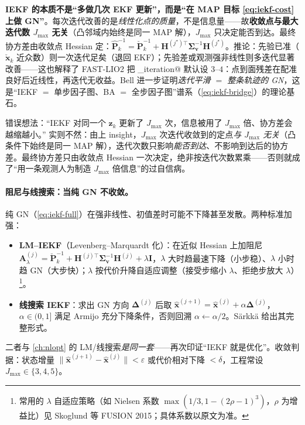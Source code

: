 \begin{insight}
\textbf{IEKF 的本质不是“多做几次 EKF 更新”，而是“在 MAP 目标 \cref{eq:iekf-cost} 上做 GN”}。每次迭代改善的是\emph{线性化点的质量}，不是信息量——故\textbf{收敛点与最大迭代数 $J_{\max}$ 无关}（凸邻域内始终是同一 MAP 解），$J_{\max}$ 只决定能否到达。最终协方差由收敛点 Hessian 定：$\hat{\mathbf{P}}_k^{-1}=\check{\mathbf{P}}_k^{-1}+\mathbf{H}^{(j^\star)\top}\boldsymbol{\Sigma}_{\mathbf{v}}^{-1}\mathbf{H}^{(j^\star)}$。推论：先验已准（$\check{\mathbf{x}}_k$ 近众数）则一次迭代足矣（退回 EKF）；先验差或观测强非线性则多迭代显著改善——这也解释了 FAST-LIO2 把 \verb@max_iteration@ 默认设 $3$--$4$：点到面残差在配准良好后近线性，再迭代无收益\cite{xu2022fastlio2}。Bell 进一步证明\emph{迭代平滑 $=$ 整条轨迹的 GN}\cite{bell1993iterated}，这是“IEKF $=$ 单步因子图、BA $=$ 全步因子图”谱系（\cref{eq:iekf-bridge}）的理论基石。
\end{insight}

\begin{pitfall}
错误想法：“IEKF 对同一个 $\mathbf{z}_k$ 更新了 $J_{\max}$ 次，信息被用了 $J_{\max}$ 倍、协方差会越缩越小。” 实则不然：由上 insight，$J_{\max}$ 次迭代收敛到的定点\emph{与 $J_{\max}$ 无关}（凸条件下始终是同一 MAP 解），迭代次数只影响\emph{能否到达}、不影响到达后的协方差。最终协方差只由收敛点 Hessian 一次决定，绝非按迭代次数累乘——否则就成了“用一条观测人为制造 $J_{\max}$ 倍信息”的过自信病。
\end{pitfall}

\paragraph{阻尼与线搜索：当纯 GN 不收敛。}
纯 GN（\cref{eq:iekf-full}）在强非线性、初值差时可能不下降甚至发散。两种标准加强\cite{barfoot2024state}：
\begin{itemize}
  \item \textbf{LM--IEKF}（Levenberg--Marquardt 化）：在近似 Hessian 上加阻尼 $\mathbf{A}_\lambda^{(j)}=\check{\mathbf{P}}_k^{-1}+\mathbf{H}^{(j)\top}\boldsymbol{\Sigma}_{\mathbf{v}}^{-1}\mathbf{H}^{(j)}+\lambda\mathbf{I}$，$\lambda$ 大时趋最速下降（小步稳）、$\lambda$ 小时趋 GN（大步快）；$\lambda$ 按代价升降自适应调整（接受步缩小 $\lambda$、拒绝步放大 $\lambda$）\footnote{常用的 $\lambda$ 自适应策略（如 Nielsen 系数 $\max(1/3,1-(2\rho-1)^3)$，$\rho$ 为增益比）见 Skoglund 等 FUSION 2015；具体系数以原文为准。}。
  \item \textbf{线搜索 IEKF}：求出 GN 方向 $\boldsymbol{\Delta}^{(j)}$ 后取 $\hat{\mathbf{x}}^{(j+1)}=\hat{\mathbf{x}}^{(j)}+\alpha\boldsymbol{\Delta}^{(j)}$，$\alpha\in(0,1]$ 满足 Armijo 充分下降条件，否则回溯 $\alpha\leftarrow\alpha/2$。Särkkä\cite{sarkka2013bayesian} 给出其完整形式。
\end{itemize}
二者与 \cref{ch:nlopt} 的 LM/线搜索\emph{是同一套}——再次印证“IEKF 就是优化”。收敛判据：状态增量 $\|\hat{\mathbf{x}}^{(j+1)}-\hat{\mathbf{x}}^{(j)}\|<\varepsilon$ 或代价相对下降 $<\delta$，工程常设 $J_{\max}\in\{3,4,5\}$。

